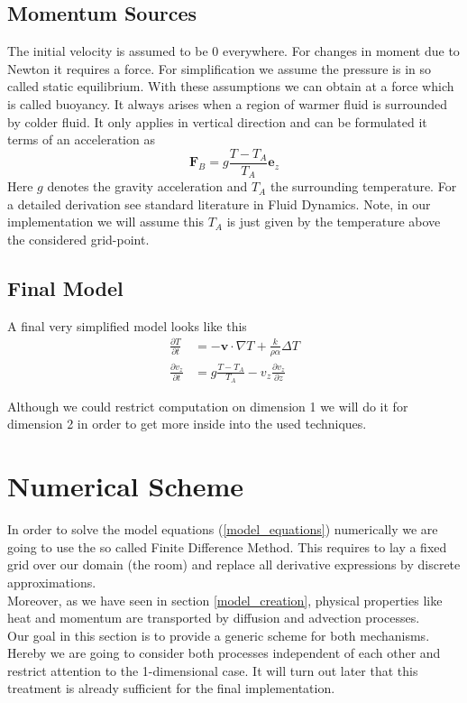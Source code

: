 \documentclass[]{article}
\begin{document}
\subsection{Momentum Sources}
The initial velocity is assumed to be 0 everywhere. For changes in moment due to Newton it requires a force. For simplification we assume the pressure is in so called static equilibrium.
With these assumptions we can obtain at a force which is called buoyancy. It always arises when
a region of warmer fluid is surrounded by colder fluid. It only applies in vertical direction and
can be formulated it terms of an acceleration as
\begin{equation}
\textbf{F}_{B}=g\frac{T-T_{A}}{T_{A}}\textbf{e}_{z}
\end{equation}
Here $g$ denotes the gravity acceleration and $T_A$ the surrounding temperature.
For a detailed derivation see standard literature in Fluid Dynamics.
Note, in our implementation we will assume this $T_A$ is just given by the temperature above
the considered grid-point.
\subsection{Final Model}

A final very simplified model looks like this
\begin{align} 
\frac{\partial T}{\partial t}&=-\textbf{v}\cdot \nabla T + \frac{k}{\rho\alpha}\Delta T \label{model_equations} \\
\frac{\partial v_{z}}{\partial t}&=g\frac{T-T_{A}}{T_{A}}-v_{z}\frac{\partial v_{z}}{\partial z} \nonumber
\end{align}

Although we could restrict computation on dimension 1 we will do it for dimension 2 in order to
get more inside into the used techniques.


\section{Numerical Scheme}
In order to solve the model equations (\ref{model_equations}) numerically we are going to use the so called Finite Difference Method. This requires to lay a fixed grid over our domain (the room) and replace all derivative expressions by discrete approximations.\\
Moreover, as we have seen in section \ref{model_creation}, physical properties like
heat and momentum are transported by diffusion and advection processes.\\
Our goal in this section is to provide a generic scheme for both mechanisms.
Hereby we are going to consider both processes independent of each other and restrict
attention to the 1-dimensional case. It will turn out later that this treatment is already
sufficient for the final implementation.\\
\end{document}
